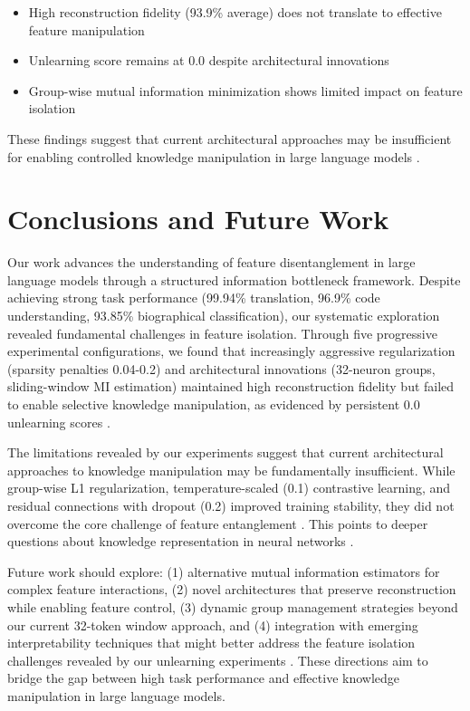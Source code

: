 \documentclass{article} %
\begin{document}
\begin{itemize}
    \item High reconstruction fidelity (93.9\% average) does not translate to effective feature manipulation
    \item Unlearning score remains at 0.0 despite architectural innovations
    \item Group-wise mutual information minimization shows limited impact on feature isolation
\end{itemize}

These findings suggest that current architectural approaches may be insufficient for enabling controlled knowledge manipulation in large language models \cite{vaswani2017attention}.

\section{Conclusions and Future Work}
\label{sec:conclusion}

Our work advances the understanding of feature disentanglement in large language models through a structured information bottleneck framework. Despite achieving strong task performance (99.94\% translation, 96.9\% code understanding, 93.85\% biographical classification), our systematic exploration revealed fundamental challenges in feature isolation. Through five progressive experimental configurations, we found that increasingly aggressive regularization (sparsity penalties 0.04-0.2) and architectural innovations (32-neuron groups, sliding-window MI estimation) maintained high reconstruction fidelity but failed to enable selective knowledge manipulation, as evidenced by persistent 0.0 unlearning scores \cite{goodfellow2016deep}.

The limitations revealed by our experiments suggest that current architectural approaches to knowledge manipulation may be fundamentally insufficient. While group-wise L1 regularization, temperature-scaled (0.1) contrastive learning, and residual connections with dropout (0.2) improved training stability, they did not overcome the core challenge of feature entanglement \cite{vaswani2017attention}. This points to deeper questions about knowledge representation in neural networks \cite{radford2019language}.

Future work should explore: (1) alternative mutual information estimators for complex feature interactions, (2) novel architectures that preserve reconstruction while enabling feature control, (3) dynamic group management strategies beyond our current 32-token window approach, and (4) integration with emerging interpretability techniques that might better address the feature isolation challenges revealed by our unlearning experiments \cite{gpt4}. These directions aim to bridge the gap between high task performance and effective knowledge manipulation in large language models.



\end{document}
